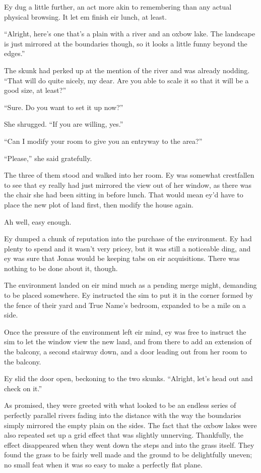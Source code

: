 Ey dug a little further, an act more akin to remembering than any actual physical browsing. It let em finish eir lunch, at least.

``Alright, here's one that's a plain with a river and an oxbow lake. The landscape is just mirrored at the boundaries though, so it looks a little funny beyond the edges.''

The skunk had perked up at the mention of the river and was already nodding. ``That will do quite nicely, my dear. Are you able to scale it so that it will be a good size, at least?''

``Sure. Do you want to set it up now?''

She shrugged. ``If you are willing, yes.''

``Can I modify your room to give you an entryway to the area?''

``Please,'' she said gratefully.

The three of them stood and walked into her room. Ey was somewhat crestfallen to see that ey really had just mirrored the view out of her window, as there was the chair she had been sitting in before lunch. That would mean ey'd have to place the new plot of land first, then modify the house again.

Ah well, easy enough.

Ey dumped a chunk of reputation into the purchase of the environment. Ey had plenty to spend and it wasn't very pricey, but it was still a noticeable ding, and ey was sure that Jonas would be keeping tabs on eir acquisitions. There was nothing to be done about it, though.

The environment landed on eir mind much as a pending merge might, demanding to be placed somewhere. Ey instructed the sim to put it in the corner formed by the fence of their yard and True Name's bedroom, expanded to be a mile on a side.

Once the pressure of the environment left eir mind, ey was free to instruct the sim to let the window view the new land, and from there to add an extension of the balcony, a second stairway down, and a door leading out from her room to the balcony.

Ey slid the door open, beckoning to the two skunks. ``Alright, let's head out and check on it.''

As promised, they were greeted with what looked to be an endless series of perfectly parallel rivers fading into the distance with the way the boundaries simply mirrored the empty plain on the sides. The fact that the oxbow lakes were also repeated set up a grid effect that was slightly unnerving. Thankfully, the effect disappeared when they went down the steps and into the grass itself. They found the grass to be fairly well made and the ground to be delightfully uneven; no small feat when it was so easy to make a perfectly flat plane.


